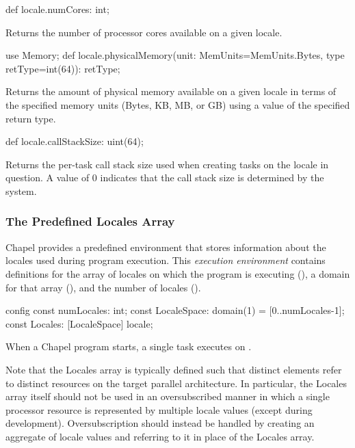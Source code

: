 \begin{protohead}
def locale.numCores: int;
\end{protohead}
\begin{protobody}
Returns the number of processor cores available on a given locale.
\end{protobody}

\begin{protohead}
use Memory;
def locale.physicalMemory(unit: MemUnits=MemUnits.Bytes, type retType=int(64)): retType;
\end{protohead}
\begin{protobody}
Returns the amount of physical memory available on a given locale in
terms of the specified memory units (Bytes, KB, MB, or GB) using a
value of the specified return type.
\end{protobody}

\begin{protohead}
def locale.callStackSize: uint(64);
\end{protohead}
\begin{protobody}
Returns the per-task call stack size used when creating tasks on the
locale in question.  A value of 0 indicates that the call stack size
is determined by the system.
\end{protobody}

\subsubsection{The Predefined Locales Array}
\label{Predefined_Locales_Array}

Chapel provides a predefined environment that stores information about
the locales used during program execution.  This {\em execution
environment} contains definitions for the array of locales on which
the program is executing (), a domain for that array
(), and the number of locales ().
\begin{chapel}
config const numLocales: int;
const LocaleSpace: domain(1) = [0..numLocales-1];
const Locales: [LocaleSpace] locale;
\end{chapel}
When a Chapel program starts, a single task executes 
on .

Note that the Locales array is typically defined such that distinct
elements refer to distinct resources on the target parallel
architecture.  In particular, the Locales array itself should not be
used in an oversubscribed manner in which a single processor resource
is represented by multiple locale values (except during development).
Oversubscription should instead be handled by creating an aggregate of
locale values and referring to it in place of the Locales array.

